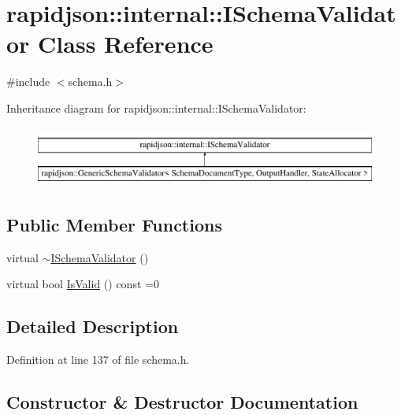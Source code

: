\hypertarget{classrapidjson_1_1internal_1_1_i_schema_validator}{}\section{rapidjson\+::internal\+::I\+Schema\+Validator Class Reference}
\label{classrapidjson_1_1internal_1_1_i_schema_validator}


{\ttfamily \#include $<$schema.\+h$>$}

Inheritance diagram for rapidjson\+::internal\+::I\+Schema\+Validator\+:\begin{figure}[H]
\begin{center}
\leavevmode
\includegraphics[height=2.000000cm]{classrapidjson_1_1internal_1_1_i_schema_validator}
\end{center}
\end{figure}
\subsection*{Public Member Functions}
\begin{DoxyCompactItemize}
\item 
virtual \mbox{\hyperlink{classrapidjson_1_1internal_1_1_i_schema_validator_a1096ac48d9dd2f0b29ed6115b2f8049d}{$\sim$\+I\+Schema\+Validator}} ()
\item 
virtual bool \mbox{\hyperlink{classrapidjson_1_1internal_1_1_i_schema_validator_a5746528d0c29832b748855896ef2bcc8}{Is\+Valid}} () const =0
\end{DoxyCompactItemize}


\subsection{Detailed Description}


Definition at line 137 of file schema.\+h.



\subsection{Constructor \& Destructor Documentation}
\mbox{\label{classrapidjson_1_1internal_1_1_i_schema_validator_a1096ac48d9dd2f0b29ed6115b2f8049d}} 
